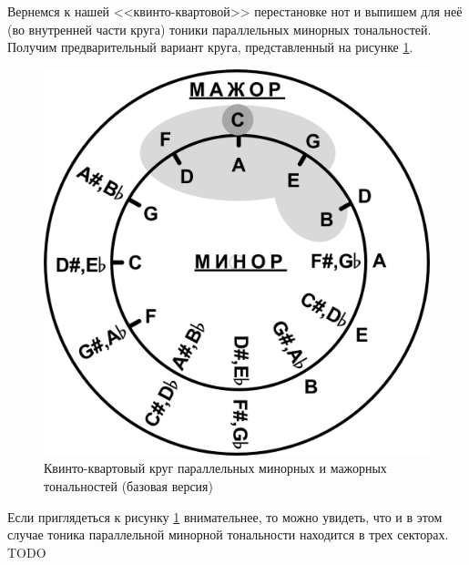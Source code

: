 Вернемся к нашей <<квинто-квартовой>> перестановке нот и выпишем для неё (во внутренней части круга) тоники параллельных минорных тональностей. Получим предварительный вариант круга, представленный на рисунке \ref{fig:harmony:kvinto-kvarto:kvinto-kvarto-parallel}.

\begin{figure}[!ht]
    \centering
    \includegraphics[scale=0.5]{fig/kvinto-kvarto/kvinto-kvarto-parallel} 
    \caption{Квинто-квартовый круг параллельных минорных и мажорных тональностей (базовая версия)}\label{fig:harmony:kvinto-kvarto:kvinto-kvarto-parallel}
\end{figure}

Если приглядеться к рисунку \ref{fig:harmony:kvinto-kvarto:kvinto-kvarto-parallel} внимательнее, то можно увидеть, что и в этом случае тоника параллельной минорной тональности находится в трех секторах. TODO
